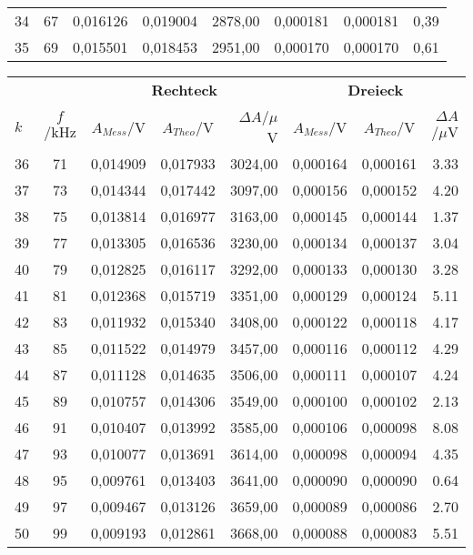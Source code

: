 \begin{center}
\begin{tabular}{l | c | c c r | c c r}
        34 &      67 &  0,016126 &  0,019004 & 2878,00 & 0,000181 &  0,000181 &    0,39 \\
        35 &      69 &  0,015501 &  0,018453 & 2951,00 & 0,000170 &  0,000170 &    0,61 \\
    \end{tabular}
    \begin{tabular}{l | c | c c r | c c r}
        \multicolumn{2}{c}{} & \multicolumn{3}{c}{\textbf{Rechteck}} & \multicolumn{3}{c}{\textbf{Dreieck}}\\
        $k$ & $f$/kHz  &   $A_{Mess}$/V & $A_{Theo}$/V & $\Delta A$/$\mu$V  &   $A_{Mess}$/V & $A_{Theo}$/V & $\Delta A$/$\mu$V\\
        \hline  
        36 &      71 &   0,014909 &  0,017933 &  3024,00 & 0,000164 &  0,000161 &   3.33 \\
        37 &      73 &   0,014344 &  0,017442 &  3097,00 & 0,000156 &  0,000152 &   4.20 \\
        38 &      75 &   0,013814 &  0,016977 &  3163,00 & 0,000145 &  0,000144 &   1.37 \\
        39 &      77 &   0,013305 &  0,016536 &  3230,00 & 0,000134 &  0,000137 &   3.04 \\
        40 &      79 &   0,012825 &  0,016117 &  3292,00 & 0,000133 &  0,000130 &   3.28 \\
        41 &      81 &   0,012368 &  0,015719 &  3351,00 & 0,000129 &  0,000124 &   5.11 \\
        42 &      83 &   0,011932 &  0,015340 &  3408,00 & 0,000122 &  0,000118 &   4.17 \\
        43 &      85 &   0,011522 &  0,014979 &  3457,00 & 0,000116 &  0,000112 &   4.29 \\
        44 &      87 &   0,011128 &  0,014635 &  3506,00 & 0,000111 &  0,000107 &   4.24 \\
        45 &      89 &   0,010757 &  0,014306 &  3549,00 & 0,000100 &  0,000102 &   2.13 \\
        46 &      91 &   0,010407 &  0,013992 &  3585,00 & 0,000106 &  0,000098 &   8.08 \\
        47 &      93 &   0,010077 &  0,013691 &  3614,00 & 0,000098 &  0,000094 &   4.35 \\
        48 &      95 &   0,009761 &  0,013403 &  3641,00 & 0,000090 &  0,000090 &   0.64 \\
        49 &      97 &   0,009467 &  0,013126 &  3659,00 & 0,000089 &  0,000086 &   2.70 \\
        50 &      99 &   0,009193 &  0,012861 &  3668,00 & 0,000088 &  0,000083 &   5.51 \\

\end{tabular}
\end{center}

